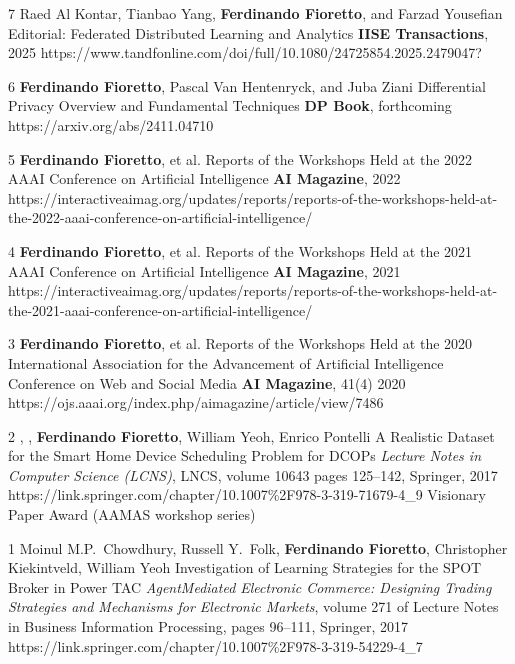 \setcounter{nJ}{8}
\begin{pubs}

\journalentry
	{7}
	{Raed Al Kontar, Tianbao Yang, {\bf Ferdinando Fioretto}, and Farzad Yousefian}
	{Editorial: Federated Distributed Learning and Analytics}
	{{\bf IISE Transactions}, 2025}
	{https://www.tandfonline.com/doi/full/10.1080/24725854.2025.2479047?}

\journalentry
	{6} %
	{{\bf Ferdinando Fioretto}, Pascal Van Hentenryck, and Juba Ziani}
	{Differential Privacy Overview and Fundamental Techniques}
	{{\bf DP Book}, forthcoming}
	{https://arxiv.org/abs/2411.04710}

\journalentry
	{5} %
	{{\bf Ferdinando Fioretto}, et al.} 
	{Reports of the Workshops Held at the 2022 AAAI Conference on Artificial Intelligence}
	{{\bf AI Magazine}, 2022}
	{https://interactiveaimag.org/updates/reports/reports-of-the-workshops-held-at-the-2022-aaai-conference-on-artificial-intelligence/}

\journalentry
	{4} %
	{{\bf Ferdinando Fioretto}, et al.} 
	{Reports of the Workshops Held at the 2021 AAAI Conference on Artificial Intelligence}
	{{\bf AI Magazine}, 2021}
	{https://interactiveaimag.org/updates/reports/reports-of-the-workshops-held-at-the-2021-aaai-conference-on-artificial-intelligence/}

\journalentry
	{3} %
	{{\bf Ferdinando Fioretto}, et al.} 
	{Reports of the Workshops Held at the 2020 International Association for the Advancement of Artificial Intelligence Conference on Web and Social Media}
	{{\bf AI Magazine},  41(4) 2020}
	{https://ojs.aaai.org/index.php/aimagazine/article/view/7486}

\journalentryAwd
	{2} %
	{, , {\bf Ferdinando Fioretto}, William Yeoh, Enrico Pontelli}
	{A Realistic Dataset for the Smart Home Device Scheduling Problem for DCOPs}
	{\emph{Lecture Notes in Computer Science (LCNS)}, LNCS, volume 10643 pages 125--142, Springer, 2017}
	{https://link.springer.com/chapter/10.1007\%2F978-3-319-71679-4\_9}
	{Visionary Paper Award}
	{(AAMAS workshop series)}

\journalentry
	{1} %
	{Moinul M.P.~Chowdhury, Russell Y.~Folk, {\bf Ferdinando Fioretto}, Christopher Kiekintveld, William Yeoh}
	{Investigation of Learning Strategies for the SPOT Broker in Power TAC}
	{\emph{AgentMediated Electronic Commerce: Designing Trading Strategies and Mechanisms for Electronic Markets}, volume 271 of Lecture Notes in Business Information Processing, 
	    pages 96–111, Springer, 2017}
    {https://link.springer.com/chapter/10.1007\%2F978-3-319-54229-4\_7}
\end{pubs}


